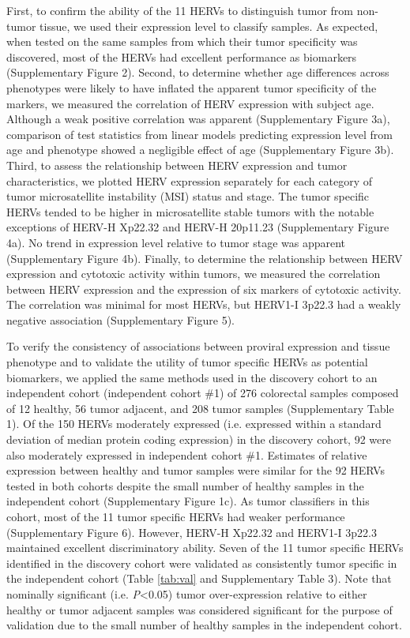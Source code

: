 First, to confirm the ability of the 11 HERVs to distinguish tumor from non-tumor tissue, we used their expression level to classify samples.
As expected, when tested on the same samples from which their tumor specificity was discovered, most of the HERVs had excellent performance as biomarkers (Supplementary Figure 2).
Second, to determine whether age differences across phenotypes were likely to have inflated the apparent tumor specificity of the markers, we measured the correlation of HERV expression with subject age.
Although a weak positive correlation was apparent (Supplementary Figure 3a), comparison of test statistics from linear models predicting expression level from age and phenotype showed a negligible effect of age (Supplementary Figure 3b).
Third, to assess the relationship between HERV expression and tumor characteristics, we plotted HERV expression separately for each category of tumor microsatellite instability (MSI) status and stage.
The tumor specific HERVs tended to be higher in microsatellite stable tumors with the notable exceptions of HERV-H Xp22.32 and HERV-H 20p11.23 (Supplementary Figure 4a).
No trend in expression level relative to tumor stage was apparent (Supplementary Figure 4b).
Finally, to determine the relationship between HERV expression and cytotoxic activity within tumors, we measured the correlation between HERV expression and the expression of six markers of cytotoxic activity.
The correlation was minimal for most HERVs, but HERV1-I 3p22.3 had a weakly negative association (Supplementary Figure 5).

To verify the consistency of associations between proviral expression and tissue phenotype and to validate the utility of tumor specific HERVs as potential biomarkers, we applied the same methods used in the discovery cohort to an independent cohort (independent cohort \#1) of 276 colorectal samples composed of 12 healthy, 56 tumor adjacent, and 208 tumor samples (Supplementary Table 1).
Of the 150 HERVs moderately expressed (i.e. expressed within a standard deviation of median protein coding expression) in the discovery cohort, 92 were also moderately expressed in independent cohort \#1.
Estimates of relative expression between healthy and tumor samples were similar for the 92 HERVs tested in both cohorts despite the small number of healthy samples in the independent cohort (Supplementary Figure 1c).
As tumor classifiers in this cohort, most of the 11 tumor specific HERVs had weaker performance (Supplementary Figure 6).
However, HERV-H Xp22.32 and HERV1-I 3p22.3 maintained excellent discriminatory ability.
Seven of the 11 tumor specific HERVs identified in the discovery cohort were validated as consistently tumor specific in the independent cohort (Table \ref{tab:val} and Supplementary Table 3).
Note that nominally significant (i.e. \emph{P}<0.05) tumor over-expression relative to either healthy or tumor adjacent samples was considered significant for the purpose of validation due to the small number of healthy samples in the independent cohort.

